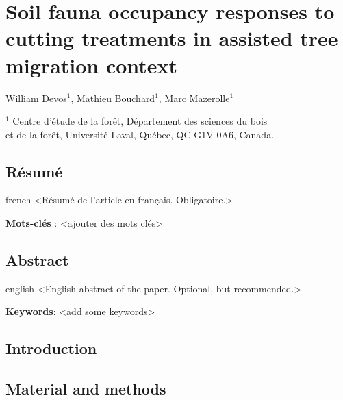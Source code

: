 \chapter{Soil fauna occupancy responses to cutting treatments in assisted tree migration context}     %
\label{chap:SEM}    

William Devos$^1$, Mathieu Bouchard$^1$, Marc Mazerolle$^1$

$^1$ Centre d'étude de la forêt, Département des sciences du bois \\ 
et de la forêt, Université Laval, Québec, QC G1V 0A6, Canada. \\ 

\clearpage



\section*{Résumé}
\label{sec:resume1}

\begin{otherlanguage*}{french}
  <Résumé de l'article en français. Obligatoire.>

  \textbf{Mots-clés} : <ajouter des mots clés>
\end{otherlanguage*}

\clearpage

\section*{Abstract}
\label{sec:abstract1}

\begin{otherlanguage*}{english}
  <English abstract of the paper. Optional, but recommended.>

\textbf{Keywords}: <add some keywords> 
\end{otherlanguage*}

\cleardoublepage

\section*{Introduction}
\label{sec:intro1}


\section*{Material and methods}
\label{sec:matmet1}

